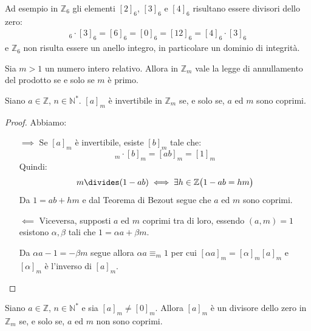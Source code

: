 \begin{example}
	Ad esempio in $\mathbb{Z}_{6}$ gli elementi $[2]_{6}$, $[3]_{6}$ e $[4]_{6}$ risultano essere divisori dello zero:
	\begin{align*}
		[2]_{6} \cdot [3]_{6} = [6]_{6} = [0]_{6} = [12]_{6}=[4]_{6} \cdot [3]_{6}
	\end{align*}
	e $\mathbb{Z}_{6}$ non risulta essere un anello integro, in particolare un dominio di integrità.
\end{example}


\begin{teorbox}
	Sia $m>1$ un numero intero relativo. Allora in $\mathbb{Z}_{m}$ vale la legge di annullamento del prodotto se e solo se $m$ è primo.
\end{teorbox}

\begin{propbox}\label{prop:invertibili_zm}
	Siano $a \in \mathbb{Z}$, $n \in \mathbb{N}^{*}$. $[a]_{m}$ è invertibile in $\mathbb{Z}_{m}$ se, e solo se, $a$ ed $m$ sono coprimi.
\end{propbox}

\begin{proof}Abbiamo:
\begin{itemize}
	\item[$\implies$] Se $[a]_{m}$ è invertibile, esiste $[b]_{m}$ tale che:
	\begin{displaymath}
		[a]_{m}\cdot[b]_{m} = [ab]_{m}=[1]_{m}
	\end{displaymath}
	Quindi: $$m \divides (1-ab) \iff \exists h \in \mathbb{Z} \bigl(1-ab = hm\bigr)$$ 
	Da $1=ab+hm$ e dal Teorema di Bezout segue che $a$ ed $m$ sono coprimi.
	
	\item[$\impliedby$] Viceversa, supposti $a$ ed $m$ coprimi tra di loro, essendo $(a,m)=1$ esistono $\alpha,\beta$ tali che $1=\alpha a + \beta m$. 
	
	Da $\alpha a-1 = -\beta m$ segue allora $\alpha a \equiv_{m} 1$ per cui $[\alpha a]_{m} = [\alpha]_{m} [a]_{m}$ e $[\alpha]_{m}$ è l'inverso di $[a]_{m}$.
\end{itemize}
\end{proof}


\begin{corolbox}
	Siano $a \in \mathbb{Z}$, $n \in \mathbb{N}^{*}$ e sia $[a]_{m} \neq [0]_{m}$. Allora $[a]_{m}$ è un divisore dello zero in $\mathbb{Z}_{m}$ se, e solo se, $a$ ed $m$ non sono coprimi.
\end{corolbox}

